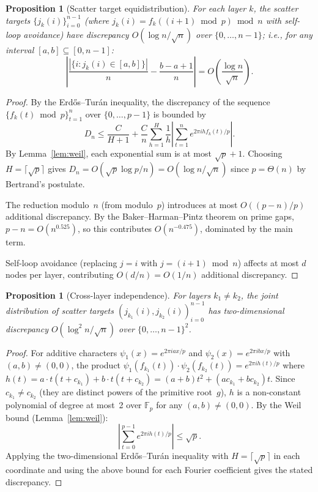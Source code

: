 \documentclass{article}
\newtheorem{proposition}[theorem]{Proposition}
\begin{document}
\begin{proposition}[Scatter target equidistribution]
\label{prop:equidist}
For each layer $k$, the scatter targets
$\{j_k(i)\}_{i=0}^{n-1}$ (where $j_k(i) = f_k((i+1) \bmod p) \bmod n$
with self-loop avoidance) have discrepancy
$O(\log n / \sqrt{n})$ over $\{0, \ldots, n-1\}$; i.e., for any
interval $[a,b] \subseteq [0, n-1]$:
\[
\left|\frac{|\{i : j_k(i) \in [a,b]\}|}{n}
  - \frac{b-a+1}{n}\right| = O\!\left(\frac{\log n}{\sqrt{n}}\right).
\]
\end{proposition}
\begin{proof}
By the Erd\H{o}s--Tur\'an inequality, the discrepancy of the sequence
$\{f_k(t) \bmod p\}_{t=1}^{n}$ over $\{0,\ldots,p-1\}$ is bounded by
\[
D_n \le \frac{C}{H+1} + \frac{C}{n}\sum_{h=1}^{H}
\frac{1}{h}\left|\sum_{t=1}^{n} e^{2\pi i h f_k(t)/p}\right|.
\]
By Lemma~\ref{lem:weil}, each exponential sum is at most
$\sqrt{p} + 1$.  Choosing $H = \lceil\sqrt{p}\rceil$ gives
$D_n = O(\sqrt{p}\log p / n) = O(\log n / \sqrt{n})$ since
$p = \Theta(n)$ by Bertrand's postulate.

The reduction modulo~$n$ (from modulo~$p$) introduces at most
$O((p-n)/p)$ additional discrepancy.  By the
Baker--Harman--Pintz theorem on prime gaps, $p - n = O(n^{0.525})$,
so this contributes $O(n^{-0.475})$, dominated by the main term.

Self-loop avoidance (replacing $j = i$ with $j = (i+1) \bmod n$)
affects at most $d$ nodes per layer, contributing $O(d/n) = O(1/n)$
additional discrepancy.
\end{proof}

\begin{proposition}[Cross-layer independence]
\label{prop:crosslayer}
For layers $k_1 \ne k_2$, the joint distribution of scatter targets
$(j_{k_1}(i), j_{k_2}(i))_{i=0}^{n-1}$ has two-dimensional discrepancy
$O(\log^2 n / \sqrt{n})$ over $\{0,\ldots,n-1\}^2$.
\end{proposition}
\begin{proof}
For additive characters $\psi_1(x) = e^{2\pi i a x/p}$ and
$\psi_2(x) = e^{2\pi i b x/p}$ with $(a,b) \ne (0,0)$, the product
$\psi_1(f_{k_1}(t))\cdot\psi_2(f_{k_2}(t)) = e^{2\pi i h(t)/p}$
where $h(t) = a\cdot t(t+c_{k_1}) + b\cdot t(t+c_{k_2})
= (a+b)t^2 + (ac_{k_1} + bc_{k_2})t$.  Since $c_{k_1} \ne c_{k_2}$
(they are distinct powers of the primitive root~$g$), $h$ is a
non-constant polynomial of degree at most~2 over $\mathbb{F}_p$ for
any $(a,b) \ne (0,0)$.  By the Weil bound (Lemma~\ref{lem:weil}):
\[
\left|\sum_{t=0}^{p-1} e^{2\pi i h(t)/p}\right| \le \sqrt{p}.
\]
Applying the two-dimensional Erd\H{o}s--Tur\'an inequality with
$H = \lceil\sqrt{p}\rceil$ in each coordinate and using the above
bound for each Fourier coefficient gives the stated discrepancy.
\end{proof}
\end{document}
